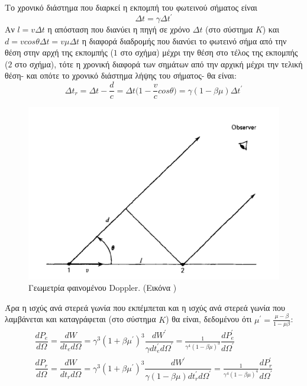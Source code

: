 Το χρονικό διάστημα που διαρκεί η εκπομπή του φωτεινού σήματος είναι $$ \Delta t = \gamma \Delta t^\prime$$
Αν $l = v \Delta t$ η απόσταση που διανύει η πηγή σε χρόνο $\Delta t$ (στο σύστημα $Κ$) και $d = v  cos\theta\Delta t = v \mu\Delta t $ η διαφορά διαδρομής που διανύει το φωτεινό σήμα από την θέση στην αρχή της εκπομπής ($1$ στο σχήμα) μέχρι την θέση στο τέλος της εκπομπής ($2$ στο σχήμα), τότε η χρονική διαφορά των σημάτων από την αρχική μέχρι την τελική θέση- και οπότε το χρονικό διάστημα λήψης του σήματος- θα είναι\cite{1986rpa..book.....R}: $$ \Delta t _r = \Delta t - \frac{d}{c} = \Delta t \big(1-\frac{v}{c}cos\theta \big) =  \gamma (1-\beta \mu) \Delta t^\prime$$
 \begin{figure}
 \begin{center}
 \includegraphics[scale= 0.2]{Figures/RelatDopplerGeometry.png}
 \caption{Γεωμετρία φαινομένου \textlatin{Doppler.} (Εικόνα \cite{1986rpa..book.....R}) }
 \label{fig:lightpathsphere}
 \end{center}
 \end{figure}
Άρα η ισχύς ανά στερεά γωνία  που εκπέμπεται και η ισχύς ανά στερεά γωνία  που λαμβάνεται και καταγράφεται (στο σύστημα $Κ$) θα είναι, δεδομένου ότι $\mu^\prime = \frac{\mu-\beta}{1-\mu \beta}$:
\begin{subequations}
\label{eq:PowerSolAngle}
\begin{align}
\dfrac{dP_e}{d\Omega} = \dfrac{dW}{dt_e d\Omega} = \gamma^3(1+\beta \mu^\prime)^3\dfrac{dW^\prime}{\gamma dt_e^\prime  d\Omega^\prime} = \frac{1}{\gamma^4 (1-\beta\mu)^3}\dfrac{dP_e^\prime}{d\Omega^\prime}   \label{eq:PowerSolAngleA} \\ 
\dfrac{dP_r}{d\Omega} = \dfrac{dW}{dt_r d\Omega} = \gamma^3(1+\beta \mu^\prime)^3\dfrac{dW^\prime}{\gamma (1-\beta \mu) dt_r^\prime  d\Omega^\prime} = \frac{1}{\gamma^4 (1-\beta\mu)^4}\dfrac{dP_r^\prime}{d\Omega^\prime}   \label{eq:PowerSolAngleB} 
\end{align}
\end{subequations}

